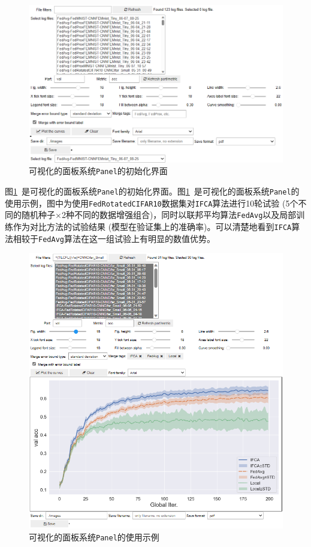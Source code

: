\begin{figure}[ht]
    \centering
    \includegraphics[width=\textwidth]{figures/panel-init.png}
    \caption{可视化的面板系统\texttt{Panel}的初始化界面}
    \label{fig:panel-init}
\end{figure}

图\ref{fig:panel-init}~是可视化的面板系统\texttt{Panel}的初始化界面。图\ref{fig:panel-init}~是可视化的面板系统\texttt{Panel}的使用示例，图中为使用\texttt{FedRotatedCIFAR10}数据集对\texttt{IFCA}算法\cite{Ghosh_2022_cfl}进行10轮试验 (5个不同的随机种子$\times$2种不同的数据增强组合)，同时以联邦平均算法\texttt{FedAvg}以及局部训练作为对比方法的试验结果 (模型在验证集上的准确率)。可以清楚地看到\texttt{IFCA}算法相较于\texttt{FedAvg}算法在这一组试验上有明显的数值优势。

\begin{figure}[ht]
    \centering
    \includegraphics[width=\textwidth]{figures/panel-in-use.png}
    \caption{可视化的面板系统\texttt{Panel}的使用示例}
    \label{fig:panel-in-use}
\end{figure}
